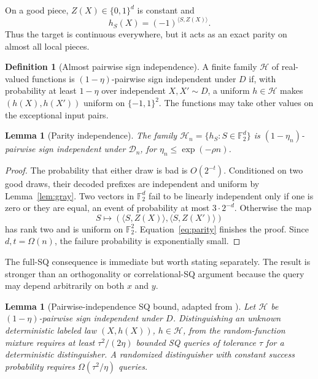 \documentclass{article}
\newtheorem{lemma}[theorem]{Lemma}
\theoremstyle{definition}
\newtheorem{definition}[theorem]{Definition}
\theoremstyle{remark}
\newcommand{\Ftwo}{\mathbb F_2}
\newcommand{\cD}{\mathcal D}
\newcommand{\cH}{\mathcal H}
\newcommand{\1}{\mathbf 1}
\begin{document}
On a good piece, $Z(X)\in\{0,1\}^d$ is constant and
\begin{equation}
h_S(X)=(-1)^{\langle S,Z(X)\rangle}.
\label{eq:parity}
\end{equation}
Thus the target is continuous everywhere, but it acts as an exact parity on almost all local pieces.

\begin{definition}[Almost pairwise sign independence]
A finite family $\cH$ of real-valued functions is $(1-\eta)$-pairwise sign independent under $D$ if, with probability at least $1-\eta$ over independent $X,X'\sim D$, a uniform $h\in\cH$ makes $(h(X),h(X'))$ uniform on $\{-1,1\}^2$. The functions may take other values on the exceptional input pairs.
\end{definition}

\begin{lemma}[Parity independence]
\label{lem:independence}
The family $\cH_n=\{h_S:S\in\Ftwo^d\}$ is $(1-\eta_n)$-pairwise sign independent under $\cD_n$, for $\eta_n\leq\exp(-\rho n)$.
\end{lemma}

\begin{proof}
The probability that either draw is bad is $O(2^{-t})$. Conditioned on two good draws, their decoded prefixes are independent and uniform by Lemma~\ref{lem:gray}. Two vectors in $\Ftwo^d$ fail to be linearly independent only if one is zero or they are equal, an event of probability at most $3\cdot2^{-d}$. Otherwise the map \[ S\longmapsto (\langle S,Z(X)\rangle,\langle S,Z(X')\rangle) \] has rank two and is uniform on $\Ftwo^2$. Equation~\eqref{eq:parity} finishes the proof. Since $d,t=\Omega(n)$, the failure probability is exponentially small.
\end{proof}

The full-SQ consequence is immediate but worth stating separately. The result is stronger than an orthogonality or correlational-SQ argument because the query may depend arbitrarily on both $x$ and $y$.

\begin{lemma}[Pairwise-independence SQ bound, adapted from \citealp{chen2022noisefree}]
\label{lem:fullsq}
Let $\cH$ be $(1-\eta)$-pairwise sign independent under $D$. Distinguishing an unknown deterministic labeled law $(X,h(X))$, $h\in\cH$, from the random-function mixture requires at least $\tau^2/(2\eta)$ bounded SQ queries of tolerance $\tau$ for a deterministic distinguisher. A randomized distinguisher with constant success probability requires $\Omega(\tau^2/\eta)$ queries.
\end{lemma}
\end{document}
